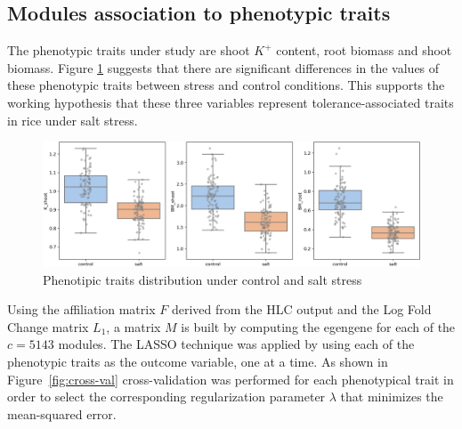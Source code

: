 \documentclass[12pt,journal, onecolumn]{IEEEtran}
\begin{document}
\subsection{Modules association to phenotypic traits}
The phenotypic traits under study are shoot $K^+$ content, root biomass and shoot biomass. Figure \ref{fig:pdata} suggests that there are significant differences in the values of these phenotypic traits between stress and control conditions. This supports the working hypothesis that these three variables represent tolerance-associated traits in rice under salt stress.\\

\begin{figure}[h]
  \centering
    \includegraphics[clip,width=1\textwidth]{Figures/phenotypic_traits.png}
  \caption{Phenotipic traits distribution under control and salt stress}
  \label{fig:pdata}
\end{figure}

Using the affiliation matrix $F$ derived from the HLC output and the Log Fold Change matrix $L_1$, a matrix $M$ is built by computing the egengene for each of the $c = 5143$ modules. The LASSO technique was applied by using each of the phenotypic traits as the outcome variable, one at a time. As shown in Figure~\ref{fig:cross-val} cross-validation was performed for each phenotypical trait in order to select the corresponding regularization parameter $\lambda$ that minimizes the mean-squared error.\\

\end{document}
